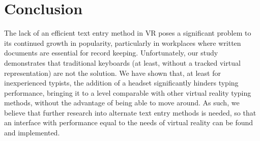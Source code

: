 \documentclass[acmlarge]{acmart}
\begin{document}
\section{Conclusion}
The lack of an efficient text entry method in VR poses a significant problem to its continued growth in popularity, particularly in workplaces where written documents are essential for record keeping. Unfortunately, our study demonstrates that traditional keyboards (at least, without a tracked virtual representation) are not the solution. We have shown that, at least for inexperienced typists, the addition of a headset significantly hinders typing performance, bringing it to a level comparable with other virtual reality typing methods, without the advantage of being able to move around. As such, we believe that further research into alternate text entry methods is needed, so that an interface with performance equal to the needs of virtual reality can be found and implemented.



\end{document}
